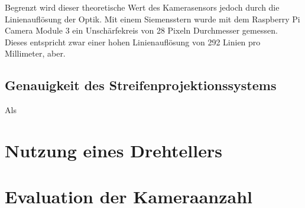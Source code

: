 \documentclass[./00PhotoBox.tex]{subfiles}
\begin{document}
Begrenzt wird dieser theoretische Wert des Kamerasensors jedoch durch die Linienauflösung der Optik. Mit einem Siemensstern wurde mit dem Raspberry Pi Camera Module 3 ein Unschärfekreis von 28 Pixeln Durchmesser gemessen. Dieses entspricht zwar einer hohen Linienauflösung von 292 Linien pro Millimeter, aber.




\subsection{Genauigkeit des Streifenprojektionssystems}
Als


\section{Nutzung eines Drehtellers}


\section{Evaluation der Kameraanzahl}

\biblio
\end{document}

